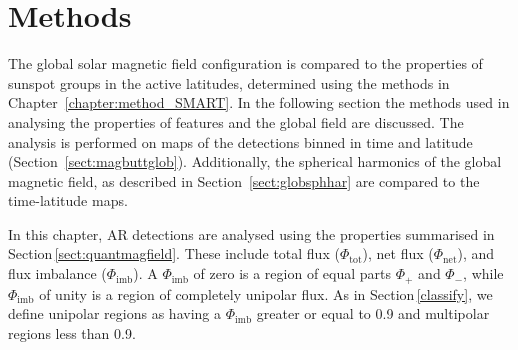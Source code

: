 \section{Methods}\label{sect:globmeth}

The global solar magnetic field configuration is compared to the properties of sunspot groups in the active latitudes, determined using the methods in Chapter~\ref{chapter:method_SMART}. In the following section the methods used in analysing the properties of features and the global field are discussed. The analysis is performed on maps of the detections binned in time and latitude (Section~\ref{sect:magbuttglob}). Additionally, the spherical harmonics of the global magnetic field, as described in Section~\ref{sect:globsphhar} are compared to the time-latitude maps.

In this chapter, AR detections are analysed using the properties summarised in Section\,\ref{sect:quantmagfield}. These include total flux ($\Phi_{\mathrm{tot}}$), net flux ($\Phi_{\mathrm{net}}$), and flux imbalance ($\Phi_{\mathrm{imb}}$). A $\Phi_{\mathrm{imb}}$ of zero is a region of equal parts $\Phi_{+}$ and $\Phi_{-}$, while $\Phi_{\mathrm{imb}}$ of unity is a region of completely unipolar flux. As in Section\,\ref{classify}, we define unipolar regions as having a $\Phi_{\mathrm{imb}}$ greater or equal to 0.9 and multipolar regions less than 0.9. 

%


